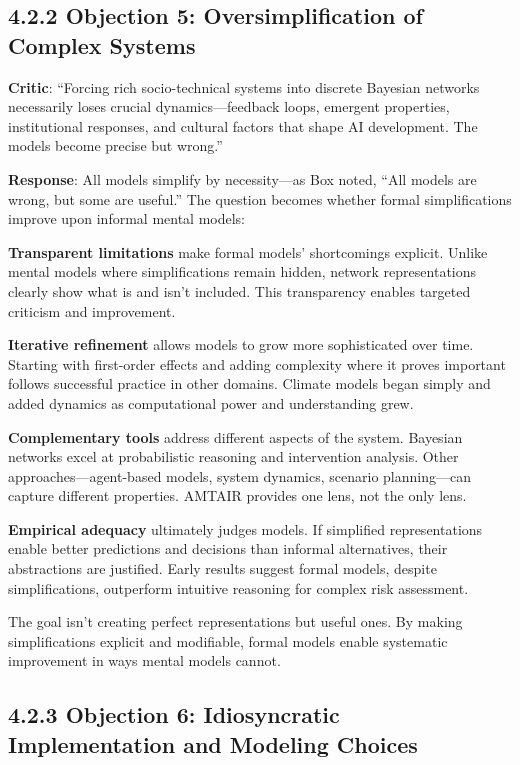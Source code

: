 \documentclass[
  11pt,
  letterpaper,
]{book}
\begin{document}
\subsection{4.2.2 Objection 5: Oversimplification of Complex
Systems}\label{sec-oversimplification}

\textbf{Critic}: ``Forcing rich socio-technical systems into discrete
Bayesian networks necessarily loses crucial dynamics---feedback loops,
emergent properties, institutional responses, and cultural factors that
shape AI development. The models become precise but wrong.''

\textbf{Response}: All models simplify by necessity---as Box noted,
``All models are wrong, but some are useful.'' The question becomes
whether formal simplifications improve upon informal mental models:

\textbf{Transparent limitations} make formal models' shortcomings
explicit. Unlike mental models where simplifications remain hidden,
network representations clearly show what is and isn't included. This
transparency enables targeted criticism and improvement.

\textbf{Iterative refinement} allows models to grow more sophisticated
over time. Starting with first-order effects and adding complexity where
it proves important follows successful practice in other domains.
Climate models began simply and added dynamics as computational power
and understanding grew.

\textbf{Complementary tools} address different aspects of the system.
Bayesian networks excel at probabilistic reasoning and intervention
analysis. Other approaches---agent-based models, system dynamics,
scenario planning---can capture different properties. AMTAIR provides
one lens, not the only lens.

\textbf{Empirical adequacy} ultimately judges models. If simplified
representations enable better predictions and decisions than informal
alternatives, their abstractions are justified. Early results suggest
formal models, despite simplifications, outperform intuitive reasoning
for complex risk assessment.

The goal isn't creating perfect representations but useful ones. By
making simplifications explicit and modifiable, formal models enable
systematic improvement in ways mental models cannot.

\subsection{4.2.3 Objection 6: Idiosyncratic Implementation and Modeling
Choices}\label{sec-idiosyncratic}
\end{document}
